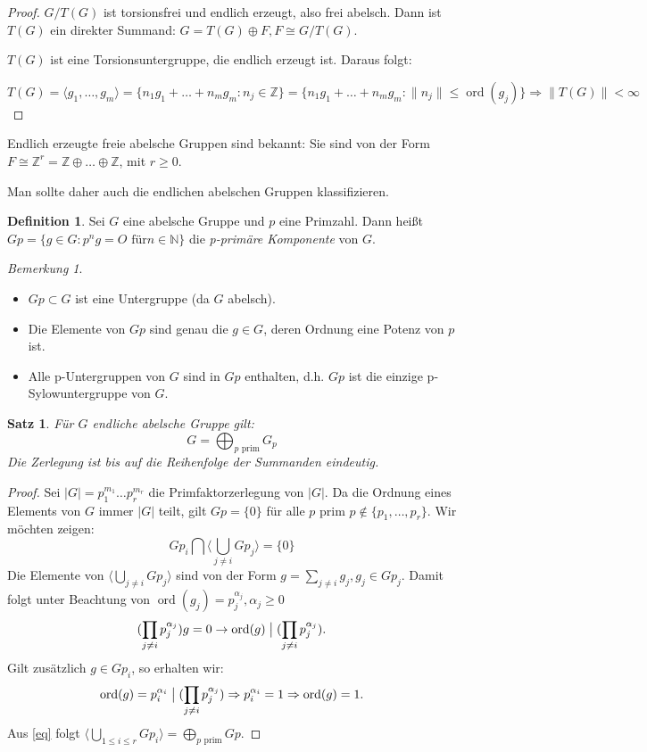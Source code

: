 \documentclass[12pt]{scrartcl} %
\DeclareMathOperator{\ord}{ord}
\newcommand{\divides}{\bigm|}
\newtheorem{thm}{Satz}
\theoremstyle{definition}
\newtheorem*{defn}{Definition}
\theoremstyle{remark}
\newtheorem*{nb}{Bemerkung}
\begin{document}
\begin{proof}
$G/T(G)$ ist torsionsfrei und endlich erzeugt, also frei abelsch. Dann ist $T(G)$ ein direkter Summand: $G = T(G) \oplus F,F\cong G/T(G)$.

$T(G)$ ist eine Torsionsuntergruppe, die endlich erzeugt ist. Daraus folgt: 

$T(G)=\langle g_{1}, \dots ,g_{m}\rangle=\{ n_{1}g_{1}+ \dots +n_{m}g_{m}:n_{j}\in \mathbb{Z}\}=\{ n_{1}g_{1}+\dots+n_{m}g_{m}:\|n_{j}\| \leq \ord(g_{j})\} \Rightarrow \|T(G)\| < \infty$
\end{proof}

Endlich erzeugte freie abelsche Gruppen sind bekannt: Sie sind von der Form $F\cong \mathbb{Z}^{r}=\mathbb{Z} \oplus \dots\oplus \mathbb{Z}$, mit $r\geq 0$.

Man sollte daher auch die endlichen abelschen Gruppen klassifizieren.

\begin{defn}
Sei $G$ eine abelsche Gruppe und $p$ eine Primzahl. 
Dann heißt $Gp=\{ g\in G:p^{n}g=O\text{ für} n \in \mathbb{N} \} $ 
die \emph{p-primäre Komponente} von $G$.
\end{defn}

\begin{nb}
\begin{itemize}
\item $Gp\subset G$ ist eine Untergruppe (da $G$ abelsch).
\item Die Elemente von $Gp$ sind genau die $g\in G$, deren Ordnung eine Potenz von $p$ ist.
\item Alle p-Untergruppen von $G$ sind in $Gp$ enthalten, d.h. $Gp$ ist die einzige p-Sylowuntergruppe von $G$.
\end{itemize}
\end{nb}

\begin{thm}
Für $G$ endliche abelsche Gruppe gilt:
\[ G=\bigoplus_{p \text{ prim}} G_{p} \]
Die Zerlegung ist bis auf die Reihenfolge der Summanden eindeutig.
\end{thm}

\begin{proof}
Sei $| G| =p_{1}^{m_{1}}\dots p_{r}^{m_{r}}$ die Primfaktorzerlegung von $| G|$. 
Da die Ordnung eines Elements von $G$ immer $| G|$ teilt, gilt $Gp=\{ 0\}$ für alle $p$ prim $p\notin \{ p_{1},\dots,p_{r}\}$. Wir möchten zeigen:
\begin{equation} \label{eq}
Gp_{i} \bigcap \langle\bigcup_{j\neq i} Gp_{j} \rangle = \{ 0 \}
\end{equation}
Die Elemente von $\langle\bigcup_{j\neq i} Gp_{j}\rangle$ sind von der Form $g=\sum_{j\neq i} g_{j}, g_{j} \in Gp_{j}$. Damit folgt unter Beachtung von $\ord(g_{j})=p_{j}^{\alpha_{j}}, \alpha_{j}\geq 0$ 
\[(\prod_{j\neq i} p_{j}^{\alpha_{j}})g=0 \rightarrow \ord(g) \divides (\prod_{j\neq i} p_{j}^{\alpha_{j}}).\]
Gilt zusätzlich $g \in Gp_{i}$, so erhalten wir:
\[ \ord(g)=p_{i}^{\alpha_{i}} \divides (\prod_{j\neq i} p_{j}^{\alpha_{j}})\Rightarrow p_{i}^{\alpha_{i}}=1 \Rightarrow \ord(g)=1.\]
Aus \eqref{eq} folgt $\langle\bigcup_{1\leq i\leq r} Gp_{i}\rangle = \bigoplus_{p\text{ prim}} Gp$.
\end{proof}
\end{document}
